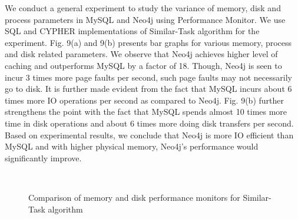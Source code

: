 \documentclass[11pt]{article}
\begin{document}
{{\par{We conduct a general experiment to study the variance of memory, disk and process parameters in MySQL and Neo4j using Performance Monitor. We use SQL and CYPHER implementations of Similar-Task algorithm for the experiment. Fig. 9(a) and 9(b) presents bar graphs for various memory, process and disk related parameters. We observe that Neo4j achieves higher level of caching and outperforms MySQL by a factor of 18. Though, Neo4j is seen to incur 3 times more page faults per second, such page faults may not necessarily go to disk. It is further made evident from the fact that MySQL incurs about 6 times more IO operations per second as compared to Neo4j. Fig. 9(b) further strengthens the point with the fact that MySQL spends almost 10 times more time in disk operations and about 6 times more doing disk transfers per second. Based on experimental results, we conclude that Neo4j is more IO efficient than MySQL and with higher physical memory, Neo4j's performance would significantly improve.}
\setlength{}
\begin{figure}[H]
  \centering
  \mbox{
    \quad
    }
  \caption{Comparison of memory and disk performance monitors for Similar-Task algorithm}
\end{figure}
%


}}
\end{document}
